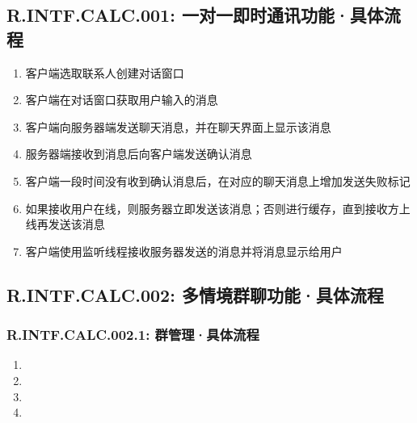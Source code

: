     \subsection{R.INTF.CALC.001: 一对一即时通讯功能·具体流程}
        \begin{enumerate}
            \item 客户端选取联系人创建对话窗口
            \item 客户端在对话窗口获取用户输入的消息
            \item 客户端向服务器端发送聊天消息，并在聊天界面上显示该消息
            \item 服务器端接收到消息后向客户端发送确认消息
            \item 客户端一段时间没有收到确认消息后，在对应的聊天消息上增加发送失败标记
            \item 如果接收用户在线，则服务器立即发送该消息；否则进行缓存，直到接收方上线再发送该消息
            \item 客户端使用监听线程接收服务器发送的消息并将消息显示给用户
        \end{enumerate}
    \subsection{R.INTF.CALC.002: 多情境群聊功能·具体流程}
        \subsubsection{R.INTF.CALC.002.1: 群管理·具体流程}
        \begin{enumerate}
            \item 
            \item
            \item
            \item
        \end{enumerate}
